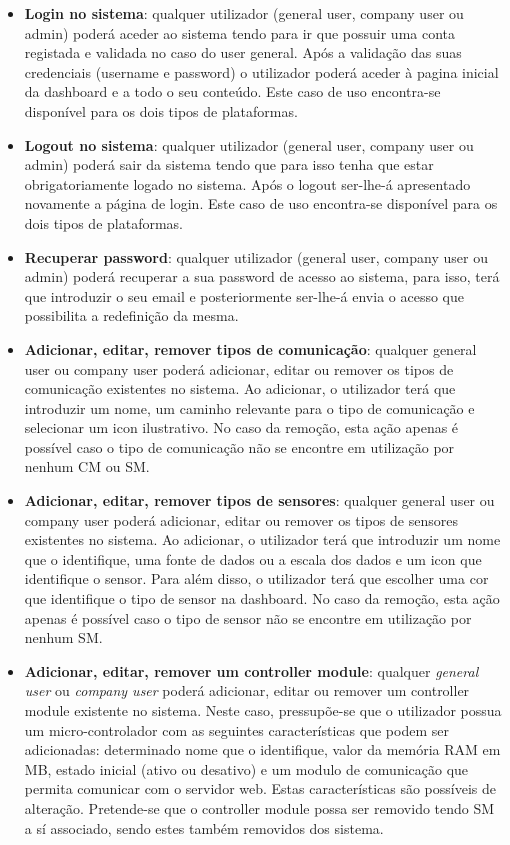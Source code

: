 \begin{itemize}
	\item \textbf{Login no sistema}: qualquer utilizador (general user, company user ou admin) poderá aceder ao sistema tendo para ir que possuir uma conta registada e validada no caso do user general. Após a validação das suas credenciais (username e password) o utilizador poderá aceder à pagina inicial da dashboard e a todo o seu conteúdo. Este caso de uso encontra-se disponível para os dois tipos de plataformas. 
	
	
	\item \textbf{Logout no sistema}: qualquer utilizador (general user, company user ou admin) poderá sair da sistema tendo que para isso tenha que estar obrigatoriamente logado no sistema. Após o logout ser-lhe-á apresentado novamente a página de login. Este caso de uso encontra-se disponível para os dois tipos de plataformas. 
	
	
	\item \textbf{Recuperar password}: qualquer utilizador (general user, company user ou admin) poderá recuperar a sua password de acesso ao sistema, para isso, terá que introduzir o seu email e posteriormente ser-lhe-á envia o acesso que possibilita a redefinição da mesma. 
	
	
	
	\item \textbf{Adicionar, editar, remover tipos de comunicação}: qualquer general user ou company user poderá adicionar, editar ou remover os tipos de comunicação existentes no sistema. Ao  adicionar, o utilizador terá que introduzir um nome, um caminho relevante para o tipo de comunicação e selecionar um icon ilustrativo. No caso da remoção, esta ação apenas é possível caso o tipo de comunicação não se encontre em utilização por nenhum \ac{CM} ou \ac{SM}.  
	
	\item \textbf{Adicionar, editar, remover tipos de sensores}: qualquer general user ou company user poderá adicionar, editar ou remover os tipos de sensores existentes no sistema. Ao  adicionar, o utilizador terá que introduzir um nome que o identifique, uma fonte de dados ou a escala dos dados  e um icon que identifique o sensor. Para além disso, o utilizador terá que escolher uma cor que identifique o tipo de sensor na dashboard. No caso da remoção, esta ação apenas é possível caso o tipo de sensor não se encontre em utilização por nenhum \ac{SM}.   
	 
	
	\item \textbf{Adicionar, editar, remover um controller module}: qualquer \textit{general user} ou \textit{company user} poderá adicionar, editar ou remover um controller module existente no sistema. Neste caso, pressupõe-se que o utilizador possua um micro-controlador com as seguintes características que podem ser adicionadas: determinado nome que o identifique, valor da memória RAM em MB, estado inicial (ativo ou desativo) e um modulo de comunicação que permita comunicar com o servidor web. Estas características são possíveis de alteração. Pretende-se que o controller module possa ser removido tendo \ac{SM} a sí associado, sendo estes também removidos dos sistema. 



\end{itemize}

